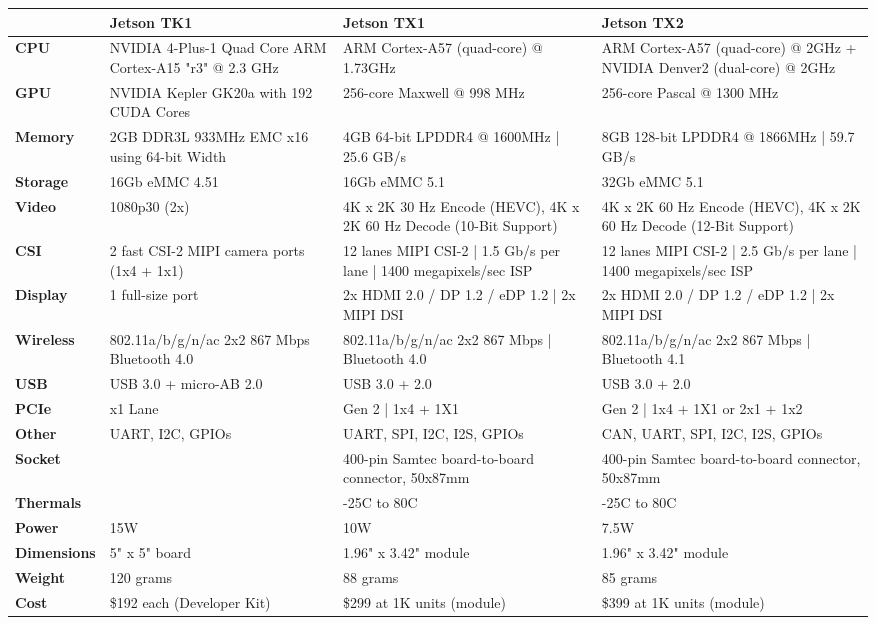 \begin{tabular}{|l|p{5cm}|p{5cm}|p{5cm}|}
	\hline
	\textbf{} & \textbf{Jetson TK1} & \textbf{Jetson TX1} & \textbf{Jetson TX2}\\
	\hline
	\textbf{CPU} & NVIDIA 4-Plus-1 Quad Core ARM Cortex-A15 "r3" @ 2.3 GHz & ARM Cortex-A57 (quad-core) @ 1.73GHz & ARM Cortex-A57 (quad-core) @ 2GHz + NVIDIA Denver2 (dual-core) @ 2GHz\\
	\hline
	\textbf{GPU} & NVIDIA Kepler GK20a with 192 CUDA Cores & 256-core Maxwell @ 998 MHz & 256-core Pascal @ 1300 MHz\\
	\hline
	\textbf{Memory} & 2GB DDR3L 933MHz EMC x16 using 64-bit Width & 4GB 64-bit LPDDR4 @ 1600MHz | 25.6 GB/s & 8GB 128-bit LPDDR4 @ 1866MHz | 59.7 GB/s\\
	\hline
	\textbf{Storage} & 16Gb eMMC 4.51 & 16Gb eMMC 5.1 & 32Gb eMMC 5.1\\
	\hline
	\textbf{Video} & 1080p30 (2x) & 4K x 2K 30 Hz Encode (HEVC), 4K x 2K 60 Hz Decode (10-Bit Support) & 4K x 2K 60 Hz Encode (HEVC), 4K x 2K 60 Hz Decode (12-Bit Support)\\
	\hline
	\textbf{CSI} & 2 fast CSI-2 MIPI camera ports (1x4 + 1x1) & 12 lanes MIPI CSI-2 | 1.5 Gb/s per lane | 1400 megapixels/sec ISP & 12 lanes MIPI CSI-2 | 2.5 Gb/s per lane | 1400 megapixels/sec ISP\\
	\hline
	\textbf{Display} & 1 full-size port & 2x HDMI 2.0 / DP 1.2 / eDP 1.2 | 2x MIPI DSI & 2x HDMI 2.0 / DP 1.2 / eDP 1.2 | 2x MIPI DSI\\
	\hline
	\textbf{Wireless} & 802.11a/b/g/n/ac 2x2 867 Mbps Bluetooth 4.0 & 802.11a/b/g/n/ac 2x2 867 Mbps | Bluetooth 4.0 & 802.11a/b/g/n/ac 2x2 867 Mbps | Bluetooth 4.1\\
	\hline
	\textbf{USB} & USB 3.0 + micro-AB 2.0 & USB 3.0 + 2.0 & USB 3.0 + 2.0\\
	\hline
	\textbf{PCIe} & x1 Lane & Gen 2 | 1x4 + 1X1 & Gen 2 | 1x4 + 1X1 or 2x1 + 1x2\\
	\hline
	\textbf{Other} & UART, I2C, GPIOs & UART, SPI, I2C, I2S, GPIOs & CAN, UART, SPI, I2C, I2S, GPIOs\\
	\hline
	\textbf{Socket} & & 400-pin Samtec board-to-board connector, 50x87mm & 400-pin Samtec board-to-board connector, 50x87mm\\
	\hline
	\textbf{Thermals} & & -25\degree C to 80\degree C & -25\degree C to 80\degree C\\
	\hline
	\textbf{Power} & 15W & 10W & 7.5W\\
	\hline
	\textbf{Dimensions} & 5" x 5" board & 1.96" x 3.42" module & 1.96" x 3.42" module\\
	\hline
	\textbf{Weight} & 120 grams & 88 grams & 85 grams\\
	\hline
	\textbf{Cost} & \$192 each (Developer Kit) & \$299 at 1K units (module) & \$399 at 1K units (module)\\
	\hline
\end{tabular}
